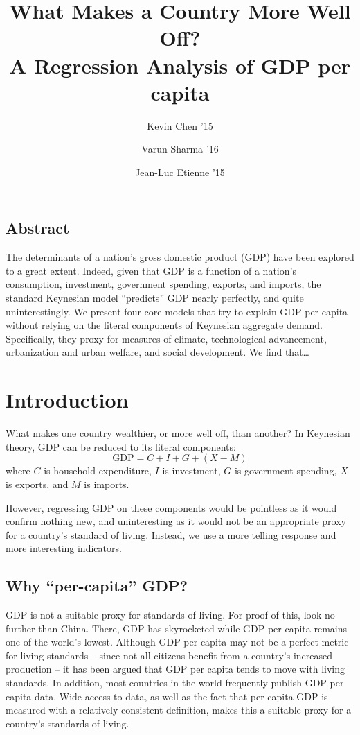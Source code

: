 \documentclass[12pt, twocolumn]{article}
\title{
  \sc
  What Makes a Country More Well Off? \\
  A Regression Analysis of GDP per capita
}
\author{
    {\rm Kevin Chen '15} \\ 
    \and
    {\rm Varun Sharma '16} \\ 
    \and
    {\rm Jean-Luc Etienne '15} \\ 
}
\begin{document}
\date{}
\maketitle
\doublespacing


\subsection*{\sc Abstract}
The determinants of a nation's gross domestic product (GDP) have been explored to a great extent.
Indeed, given that GDP is a function of a nation's 
consumption, investment, government spending, exports, and imports, 
the standard Keynesian model ``predicts'' GDP nearly perfectly, and quite uninterestingly.
We present four core models that try to explain GDP per capita without 
relying on the literal components of Keynesian aggregate demand.
Specifically, they proxy for measures of climate, technological advancement, 
urbanization and urban welfare, and social development.
We find that\dots %




\section{\sc Introduction}
What makes one country wealthier, or more well off, than another?
In Keynesian theory, GDP can be reduced to its literal components:
$$\mathrm{GDP} = C + I + G + (X - M)$$
where 
$C$ is household expenditure, 
$I$ is investment, 
$G$ is government spending,
$X$ is exports, and
$M$ is imports.

However, regressing GDP on these components would be pointless as it would confirm nothing new,
and uninteresting as it would not be an appropriate proxy for a country's standard of living.
Instead, we use a more telling response and more interesting indicators.

\subsection{\sc Why ``per-capita'' GDP?}
GDP is not a suitable proxy for standards of living.
For proof of this, look no further than China.
There, GDP has skyrocketed while GDP per capita remains one of the world's lowest. 
Although GDP per capita may not be a perfect metric for living standards -- 
since not all citizens benefit from a country's increased production -- 
it has been argued that GDP per capita tends to move with living standards.
In addition, most countries in the world frequently publish GDP per capita data.
Wide access to data, as well as the fact that per-capita GDP is measured 
with a relatively consistent definition, makes this a suitable proxy for a
country's standards of living.
\end{document}
